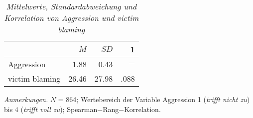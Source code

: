 \begin{table}[htb]
    \caption[Mittelwerte, Standardabweichung und Korrelation von Aggression und victim blaming]{\textit {Mittelwerte, Standardabweichung und Korrelation von Aggression und victim blaming}} 
    \label{H1_Spearman}
    \centering
    \begin{adjustbox}{width=6.5cm} %
    \small
    \begin{tabular}{lrrr}
      \hline
        & $M$   & $SD$ & 1 \\
      \hline
    Aggression      & 1.88  & 0.43   & $-$      \\
    victim blaming  & 26.46 & 27.98  & .088      \\
       \hline
    \end{tabular}
    \end{adjustbox}
    
    \begin{tablenotes}
        \item \textit{Anmerkungen.} \( N \) = 864; Wertebereich der Variable Aggression 1 (\textit{trifft nicht zu}) bis 4 (\textit{trifft voll zu}); Spearman$-$Rang$-$Korrelation.
      \end{tablenotes}
    \end{table}

